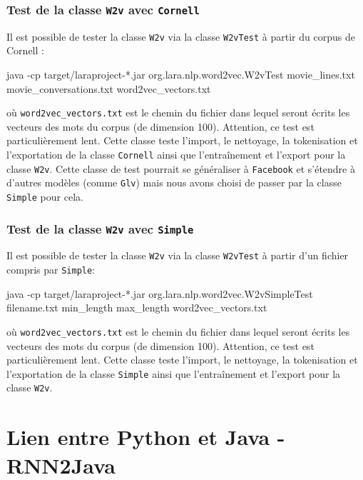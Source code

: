 \documentclass[10pt,a4paper]{article}
\begin{document}
\subsubsection{Test de la classe \texttt{W2v} avec \texttt{Cornell}}
Il est possible de tester la classe \texttt{W2v} via la classe \texttt{W2vTest} à partir du corpus de Cornell :
\begin{center}
java -cp target/laraproject-*.jar org.lara.nlp.word2vec.W2vTest movie\_lines.txt movie\_conversations.txt word2vec\_vectors.txt
\end{center}
où \texttt{word2vec\_vectors.txt} est le chemin du fichier dans lequel seront écrits les vecteurs des mots du corpus (de dimension 100). Attention, ce test est particulièrement lent. Cette classe teste l'import, le nettoyage, la tokenisation et l'exportation de la classe \texttt{Cornell} ainsi que l'entraînement et l'export pour la classe \texttt{W2v}. Cette classe de test pourrait se généraliser à \texttt{Facebook} et s'étendre à d'autres modèles (comme \texttt{Glv}) mais nous avons  choisi de passer par la classe \texttt{Simple} pour cela.
\subsubsection{Test de la classe \texttt{W2v} avec \texttt{Simple}}
Il est possible de tester la classe \texttt{W2v} via la classe \texttt{W2vTest} à partir d'un fichier compris par \texttt{Simple}:
\begin{center}
java -cp target/laraproject-*.jar org.lara.nlp.word2vec.W2vSimpleTest filename.txt min\_length max\_length word2vec\_vectors.txt
\end{center}
où \texttt{word2vec\_vectors.txt} est le chemin du fichier dans lequel seront écrits les vecteurs des mots du corpus (de dimension 100). Attention, ce test est particulièrement lent. Cette classe teste l'import, le nettoyage, la tokenisation et l'exportation de la classe \texttt{Simple} ainsi que l'entraînement et l'export pour la classe \texttt{W2v}.


\section{Lien entre Python et Java - RNN2Java}
\end{document}
